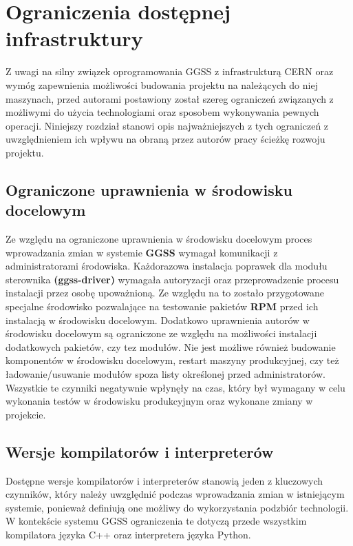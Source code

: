 
\chapter{Ograniczenia dostępnej infrastruktury}
\label{cha:ogra}
Z uwagi na silny związek oprogramowania GGSS z infrastrukturą CERN oraz wymóg zapewnienia możliwości budowania projektu na należących do niej maszynach, przed autorami postawiony został szereg ograniczeń związanych z możliwymi do użycia technologiami oraz sposobem wykonywania pewnych operacji. Niniejszy rozdział stanowi opis najważniejszych z tych ograniczeń z uwzględnieniem ich wpływu na obraną przez autorów pracy ścieżkę rozwoju projektu.


\section{Ograniczone uprawnienia w środowisku docelowym}
Ze względu na ograniczone uprawnienia w środowisku docelowym proces wprowadzania zmian w systemie \textbf{GGSS} wymagał komunikacji z administratorami środowiska. Każdorazowa instalacja poprawek dla modułu sterownika \textbf{(ggss-driver)} wymagała autoryzacji oraz przeprowadzenie procesu instalacji przez osobę upoważnioną. Ze względu na to zostało przygotowane specjalne środowisko pozwalające na testowanie pakietów \textbf{RPM} przed ich instalacją w środowisku docelowym. Dodatkowo uprawnienia autorów w środowisku docelowym są ograniczone ze względu na możliwości instalacji dodatkowych pakietów, czy tez modułów. Nie jest możliwe również budowanie komponentów w środowisku docelowym, restart maszyny produkcyjnej, czy też ładowanie/usuwanie modułów spoza listy określonej przed administratorów. Wszystkie te czynniki negatywnie wpłynęły na czas, który był wymagany w celu wykonania testów w środowisku produkcyjnym oraz wykonane zmiany w projekcie.


\section{Wersje kompilatorów i interpreterów}
Dostępne wersje kompilatorów i interpreterów stanowią jeden z kluczowych czynników, który należy uwzględnić podczas wprowadzania zmian w istniejącym systemie, ponieważ definiują one możliwy do wykorzystania podzbiór technologii. W kontekście systemu GGSS ograniczenia te dotyczą przede wszystkim kompilatora języka C++ oraz interpretera języka Python. 

